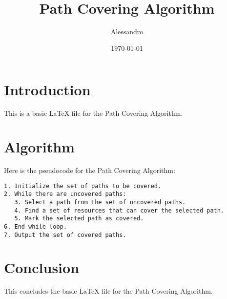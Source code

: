 \documentclass{article}
\begin{document}
\title{Path Covering Algorithm}
\author{Alessandro}
\date{\today}

\maketitle

\section{Introduction}
This is a basic LaTeX file for the Path Covering Algorithm.

\section{Algorithm}
Here is the pseudocode for the Path Covering Algorithm:

\begin{verbatim}
1. Initialize the set of paths to be covered.
2. While there are uncovered paths:
   3. Select a path from the set of uncovered paths.
   4. Find a set of resources that can cover the selected path.
   5. Mark the selected path as covered.
6. End while loop.
7. Output the set of covered paths.
\end{verbatim}

\section{Conclusion}
This concludes the basic LaTeX file for the Path Covering Algorithm.
\end{document}
